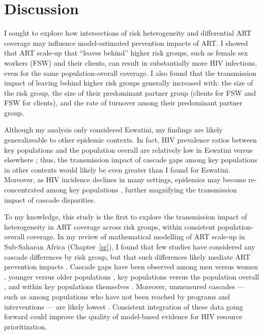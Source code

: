 \section{Discussion}\label{art.disc}
I sought to explore how intersections of risk heterogeneity and differential ART coverage
may influence model-estimated prevention impacts of ART.
I showed that ART scale-up that ``leaves behind'' higher risk groups,
such as female sex workers (FSW) and their clients,
can result in substantially more HIV infections,
even for the same population-overall coverage.
I also found that the transmission impact of leaving behind higher risk groups
generally increased with:
the size of the risk group,
the size of their predominant partner group (\ie clients for FSW and FSW for clients),
and the rate of turnover among their predominant partner group.
\par
Although my analysis only considered Eswatini,
my findings are likely generalizeable to other epidemic contexts.
In fact, HIV prevalence ratios between key populations and the population overall
are relatively low in Eswatini versus elsewhere \cite{Baral2012,Hessou2019};
thus, the transmission impact of cascade gaps among key populations in other contexts
would likely be even greater than I found for Eswatini.
Moreover, as HIV incidence declines in many settings,
epidemics may become re-concentrated among key populations \cite{Brown2019,Garnett2021},
further magnifying the transmission impact of cascade disparities.
\par
To my knowledge, this study is the first to explore the transmission impact of
heterogeneity in ART coverage across risk groups, within consistent population-overall coverage.
In my review of mathematical modelling of ART scale-up in Sub-Saharan Africa (Chapter~\ref{sr}),
I found that few studies have considered any cascade differences by risk group,
but that such differences likely mediate ART prevention impacts \cite{Knight2022sr}.
Cascade gaps have been observed among men versus women \cite{Quinn2019,Green2020},
younger versus older populations \cite{Green2020,Lebelonyane2021},
key populations versus the population overall \cite{Hakim2018},
and within key populations themselves \cite{Mayanja2018,Jaffer2022}.
Moreover, unmeasured cascades
--- such as among populations who have not been reached by programs and interventions ---
are likely lowest \cite{Hakim2018,Boothe2021}.
Consistent integration of these data going forward could
improve the quality of model-based evidence for HIV resource prioritization.
\par
